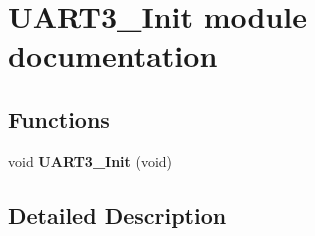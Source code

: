 \hypertarget{group___u_a_r_t3___init__module}{}\section{U\+A\+R\+T3\+\_\+\+Init module documentation}
\label{group___u_a_r_t3___init__module}
\subsection*{Functions}
\begin{DoxyCompactItemize}
\item 
void {\bfseries U\+A\+R\+T3\+\_\+\+Init} (void)\hypertarget{group___u_a_r_t3___init__module_ga1a6ca6e7205982dc1338840d6fbe4c6e}{}\label{group___u_a_r_t3___init__module_ga1a6ca6e7205982dc1338840d6fbe4c6e}

\end{DoxyCompactItemize}


\subsection{Detailed Description}
